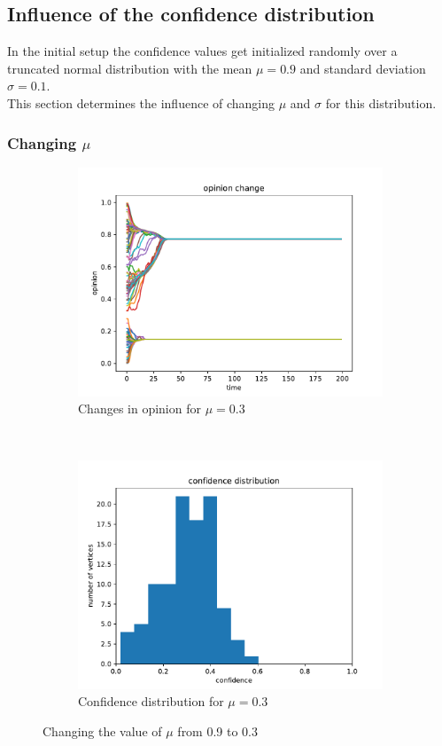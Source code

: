 \documentclass[11pt]{article}
\begin{document}
\subsection{Influence of the confidence distribution}
In the initial setup the confidence values get initialized randomly over a truncated normal distribution with the mean $\mu=0.9$ and standard deviation $\sigma=0.1$.\\
This section determines the influence of changing $\mu$ and $\sigma$ for this distribution.
\subsubsection{Changing $\mu$}

\begin{figure}[H]
    \begin{subfigure}[t]{0.5\textwidth}
    \includegraphics[width = \linewidth]{img/mu_3.pdf}
    \caption{Changes in opinion for $\mu=0.3$}\label{sfig:mu3}
    \end{subfigure}
    ~
    \begin{subfigure}[t]{0.5\textwidth}
    \includegraphics[width = \linewidth]{img/mu_33.pdf}
    \caption{Confidence distribution for $\mu=0.3$}\label{sfig:mu33}
    \end{subfigure}
    \caption{Changing the value of $\mu$ from 0.9 to 0.3}\label{sfig:mu1}
\end{figure}
\end{document}
